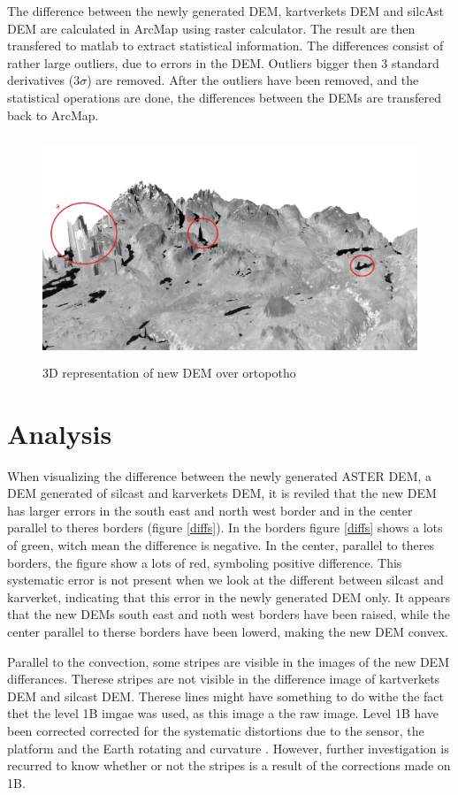 \documentclass[a4paper,UKenglish]{article}
\begin{document}
The difference between the newly generated DEM, kartverkets DEM and silcAst DEM are calculated in ArcMap using raster calculator. The result are then transfered to matlab to extract statistical information. The differences consist of rather large outliers, due to errors in the DEM. Outliers bigger then 3 standard derivatives ($3\sigma$) are removed. After the outliers have been removed, and the statistical operations are done, the differences between the DEMs are transfered back to ArcMap.

\begin{figure}
	\includegraphics[height=6.7cm]{3dbilde3}
	\caption{3D representation of new DEM over ortopotho}
	\label{3dimage}
\end{figure}

\section{Analysis}

When visualizing the difference between the newly generated ASTER DEM, a DEM generated of silcast and karverkets DEM, it is reviled that the new DEM has larger errors in the south east and north west border and in the center parallel to theres borders (figure \ref{diffs}). In the borders figure \ref{diffs} shows a lots of green, witch mean the difference is negative. In the center, parallel to theres borders, the figure show a lots of red, symboling positive difference. This systematic error is not present when we look at the different between silcast and karverket, indicating that this error in the newly generated DEM only. It appears that the new DEMs south east and noth west borders have been raised, while the center parallel to therse borders have been lowerd, making the new DEM convex.

Parallel to the convection, some stripes are visible in the images of the new DEM differances. Therese stripes are not visible in the difference image of kartverkets DEM and silcast DEM. Therese lines might have something to do withe the fact thet the level 1B imgae was used, as this image a the raw image. Level 1B have been corrected corrected for the systematic distortions due to the sensor, the platform and the Earth rotating and curvature \citep{toutin01}. However, further investigation is recurred to know whether or not the stripes is a result of the corrections made on 1B.
\end{document}
